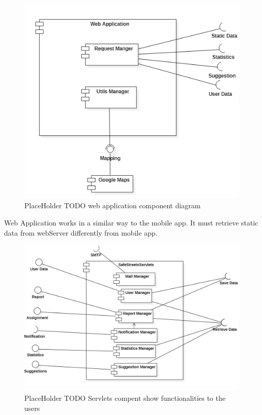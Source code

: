 \begin{figure}[H]
\centering
\includegraphics{Images/WebAppComponent.png}
\caption{\label{fig:ComWI}PlaceHolder TODO web application component diagram}
\end{figure}
Web Application works in a similar way to the mobile app. It must retrieve static data from webServer differently from mobile app.
\newline
\begin{figure}[H]
\centering
\includegraphics[width=\textwidth]{Images/ServletsComponent.png}
\caption{\label{fig:ComWI}PlaceHolder TODO Servlets compent show functionalities to the users}
\end{figure}
